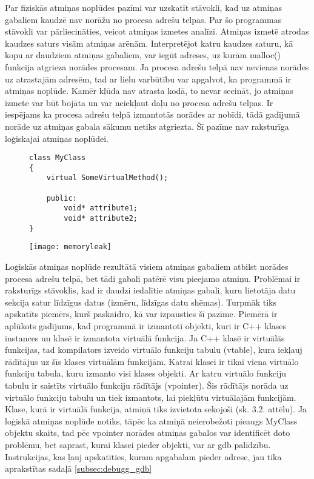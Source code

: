 Par fiziskās atmiņas noplūdes pazīmi var uzskatīt stāvokli, kad uz atmiņas gabaliem kaudzē nav norāžu no procesa adrešu telpas.
Par šo programmas stāvokli var pārliecināties, veicot atmiņas izmetes analīzi.
Atmiņas izmetē atrodas kaudzes saturs visām atmiņas arēnām.
Interpretējot katru kaudzes saturu, kā kopu ar daudziem atmiņas gabaliem, var iegūt adreses, uz kurām malloc() funkcija atgrieza norādes procesam.
Ja procesa adrešu telpā nav nevienas norādes uz atrastajām adresēm, tad ar lielu varbūtību var apgalvot, ka programmā ir atmiņas noplūde.
Kamēr kļūda nav atrasta kodā, to nevar secināt, jo atmiņas izmete var būt bojāta un var neiekļaut daļu no procesa adrešu telpas.
Ir iespējams ka procesa adrešu telpā izmantotās norādes ar nobīdi, tādā gadījumā norāde uz atmiņas gabala sākumu netiks atgriezta.
Šī pazīme nav raksturīga loģiskajai atmiņas noplūdei.


\begin{figure}[h]
\begin{lstlisting}
class MyClass
{
    virtual SomeVirtualMethod();

    public:
        void* attribute1;
        void* attribute2;
}
\end{lstlisting}
\end{figure}
\begin{figure}[h]
\begin{center}
\texttt{[image: memoryleak]}
\end{center}
\caption{\textbf{\fontsize{11}{12}\selectfont {C++ klases ar virtuālo funkciju izvietojums atmiņā }}}
\label{fig:memoryleak}
\end{figure}

Loģiskās atmiņas noplūde rezultātā visiem atmiņas gabaliem atbilst norādes procesa adrešu telpā, bet tādi gabali patērē visu pieejamo atmiņu.
Problēmai ir raksturīgs stāvoklis, kad ir daudzi iedalītie atmiņas gabali, kuru lietotāja datu sekcija satur līdzīgus datus (izmēru, līdzīgas datu shēmas).
Turpmāk tiks apskatīts piemērs, kurš paskaidro, kā var izpausties šī pazīme.
Piemērā ir aplūkots gadījums, kad programmā ir izmantoti objekti, kuri ir  C++ klases instances un klasē ir izmantota virtuālā funkcija.
Ja C++ klasē ir virtuālās funkcijas, tad kompilators izveido virtuālo funkciju tabulu (vtable), kura iekļauj rādītājus uz šīs klases virtuālām funkcijām.
 Katrai klasei ir tikai viena virtuālo funkciju tabula, kuru izmanto visi klases objekti.
 Ar katru virtuālo funkciju tabulu ir saistīts virtuālo funkciju rādītājs (vpointer).
 Šis rādītājs norāda uz virtuālo funkciju tabulu un tiek izmantots, lai piekļūtu virtuālajām funkcijām.
Klase, kurā ir virtuālā funkcija, atmiņā tiks izvietota sekojoši (sk. 3.2. attēlu).
Ja loģiskā atmiņas noplūde notiks, tāpēc ka atmiņā neierobežoti pieaugs MyClass objektu skaits, tad pēc vpointer norādes atmiņas gabalos var identificēt doto problēmu, bet saprast, kurai klasei pieder objekti, var ar gdb palīdzību.
Instrukcijas, kas ļauj apskatīties, kuram apgabalam pieder adrese, jau tika aprakstītas sadaļā \ref{subsec:debugg_gdb}


